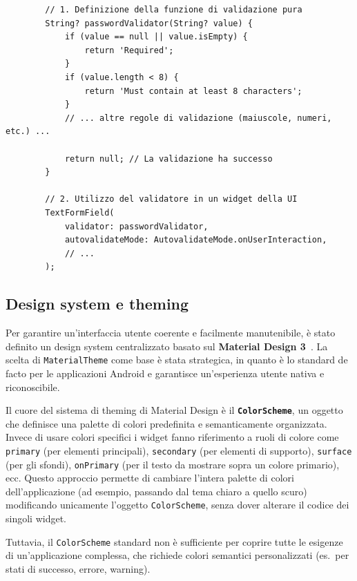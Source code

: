\begin{longlisting}
    \begin{verbatim}
        // 1. Definizione della funzione di validazione pura
        String? passwordValidator(String? value) {
            if (value == null || value.isEmpty) {
                return 'Required';
            }
            if (value.length < 8) {
                return 'Must contain at least 8 characters';
            }
            // ... altre regole di validazione (maiuscole, numeri, etc.) ...

            return null; // La validazione ha successo
        }

        // 2. Utilizzo del validatore in un widget della UI
        TextFormField(
            validator: passwordValidator,
            autovalidateMode: AutovalidateMode.onUserInteraction,
            // ...
        );
    \end{verbatim}
    \caption{Esempio di validatore centralizzato e suo utilizzo in un widget.}
    \label{lst:validators}
\end{longlisting}

\subsection{Design system e theming}\label{subsec:design-system-e-theming}
Per garantire un'interfaccia utente coerente e facilmente manutenibile, è stato definito un design system centralizzato basato sul \textbf{Material Design 3}~\cite{material_design_docs}.
La scelta di \texttt{MaterialTheme} come base è stata strategica, in quanto è lo standard de facto per le applicazioni Android e garantisce un'esperienza utente nativa e riconoscibile.

Il cuore del sistema di theming di Material Design è il \textbf{\texttt{ColorScheme}}, un oggetto che definisce una palette di colori predefinita e semanticamente organizzata.
Invece di usare colori specifici i widget fanno riferimento a ruoli di colore come \texttt{primary} (per elementi principali), \texttt{secondary} (per elementi di supporto), \texttt{surface} (per gli sfondi), \texttt{onPrimary} (per il testo da mostrare sopra un colore primario), ecc\@.
Questo approccio permette di cambiare l'intera palette di colori dell'applicazione (ad esempio, passando dal tema chiaro a quello scuro) modificando unicamente l'oggetto \texttt{ColorScheme}, senza dover alterare il codice dei singoli widget.

Tuttavia, il \texttt{ColorScheme} standard non è sufficiente per coprire tutte le esigenze di un'applicazione complessa, che richiede colori semantici personalizzati (es.\ per stati di successo, errore, warning).

